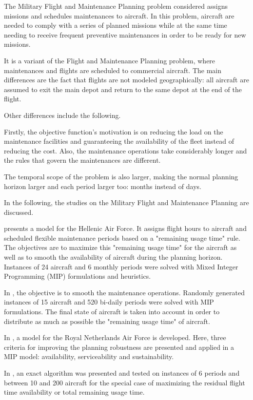 \documentclass[a4paper,twocolumn,fleqn]{article}
\begin{document}
  The Military Flight and Maintenance Planning problem considered assigns missions and schedules maintenances to aircraft. In this problem, aircraft are needed to comply with a series of planned missions while at the same time needing to receive frequent preventive maintenances in order to be ready for new missions.

  It is a variant of the Flight and Maintenance Planning problem, where maintenances and flights are scheduled to commercial aircraft. The main differences are the fact that flights are not modeled geographically: all aircraft are assumed to exit the main depot and return to the same depot at the end of the flight.

  Other differences include the following.

  Firstly, the objective function's motivation is on reducing the load on the maintenance facilities and guaranteeing the availability of the fleet instead of reducing the cost. Also, the maintenance operations take considerably longer and the rules that govern the maintenances are different.

  The temporal scope of the problem is also larger, making the normal planning horizon larger and each period larger too: months instead of days.

  In the following, the studies on the Military Flight and Maintenance Planning are discussed.

  \cite{Kozanidis2008} presents a model for the Hellenic Air Force. It assigns flight hours to aircraft and scheduled flexible maintenance periods based on a "remaining usage time" rule. The objectives are to maximize this "remaining usage time" for the aircraft as well as to smooth the availability of aircraft during the planning horizon. Instances of 24 aircraft and 6 monthly periods were solved with Mixed Integer Programming (MIP) formulations and heuristics.

  In \cite{Cho2011}, the objective is to smooth the maintenance operations. Randomly generated instances of 15 aircraft and 520 bi-daily periods were solved with MIP formulations. The final state of aircraft is taken into account in order to distribute as much as possible the "remaining usage time" of aircraft.

  In \cite{Verhoeff2015}, a model for the Royal Netherlands Air Force is developed. Here, three criteria for improving the planning robustness are presented and applied in a MIP model: availability, serviceability and sustainability.

  In \cite{gavranis2015exact}, an exact algorithm was presented and tested on instances of 6 periods and between 10 and 200 aircraft for the special case of maximizing the residual flight time availability or total remaining usage time. 
\end{document}
